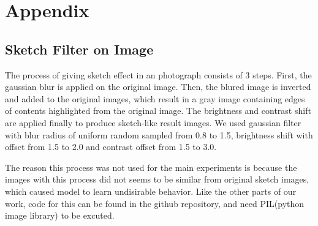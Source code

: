 \chapter{Appendix}\label{Ch:Polishing}

\section{Sketch Filter on Image}

The process of giving sketch effect in an photograph consists of 3 steps. First, the gaussian blur is applied on the original image. Then, the blured image is inverted and added to the original images, which result in a gray image containing edges of contents highlighted from the original image. The brightness and contrast shift are applied finally to produce sketch-like result images. We used gaussian filter with blur radius of uniform random sampled from 0.8 to 1.5, brightness shift with offset from 1.5 to 2.0 and contrast offset from 1.5 to 3.0.

The reason this process was not used for the main experiments is because the images with this process did not seems to be similar from original sketch images, which caused model to learn undisirable behavior. Like the other parts of our work, code for this can be found in the github repository, and need PIL(python image library) to be excuted.

\endinput
